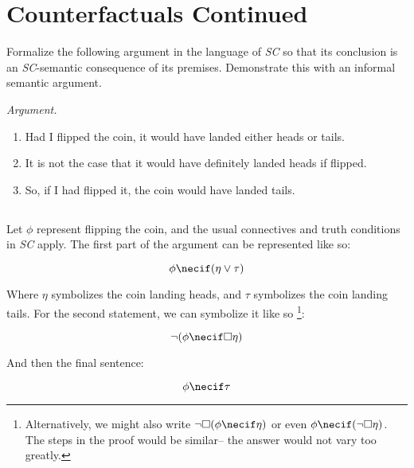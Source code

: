 \documentclass{article}
\begin{document}
    \section{Counterfactuals Continued}
    \begin{task}
        Formalize the following argument in the language of \textit{SC} so that its conclusion is an \textit{SC}-semantic consequence of its premises.
        Demonstrate this with an informal semantic argument.
    \end{task}

    \textit{Argument.}
    \begin{enumerate}
        \item Had I flipped the coin, it would have landed either heads or tails.
        \item It is not the case that it would have definitely landed heads if flipped.
        \item So, if I had flipped it, the coin would have landed tails.
    \end{enumerate}

        \subsection{}
        Let $\phi$ represent flipping the coin, and the usual connectives and truth conditions in \textit{SC} apply.
        The first part of the argument can be represented like so:

        \begin{equation}
            \phi \necif (\eta \vee \tau)
        \end{equation}

        Where $\eta$ symbolizes the coin landing heads, and $\tau$ symbolizes the coin landing tails.
        For the second statement, we can symbolize it like so \footnote{Alternatively, we might also write $\lnot \Box (\phi \necif \eta)$ or even $\phi \necif (\lnot \Box \eta)$. The steps in the proof would be similar-- the answer would not vary too greatly.}: 

        \begin{equation}
            \lnot (\phi \necif \Box \eta) 
        \end{equation}
    
        And then the final sentence:

        \begin{equation}
            \phi \necif \tau
        \end{equation}
\end{document}
